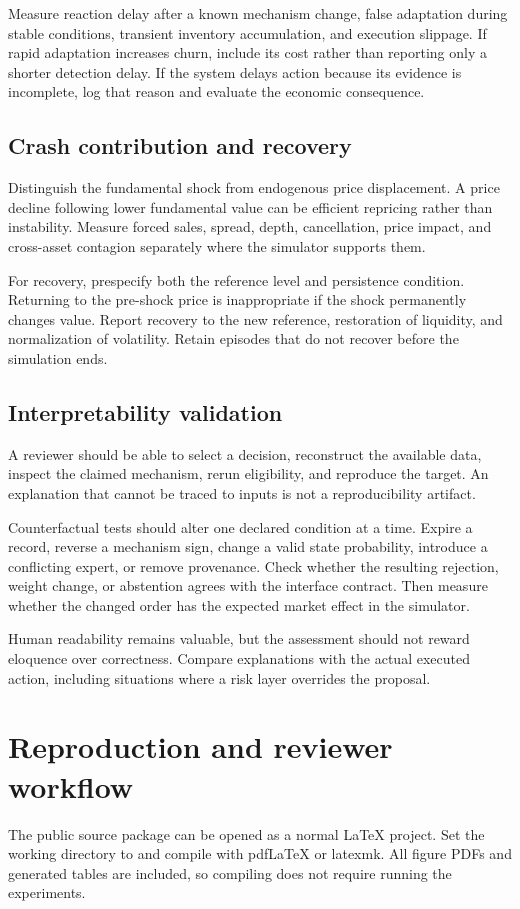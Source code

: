 Measure reaction delay after a known mechanism change, false adaptation during stable conditions, transient inventory accumulation, and execution slippage. If rapid adaptation increases churn, include its cost rather than reporting only a shorter detection delay. If the system delays action because its evidence is incomplete, log that reason and evaluate the economic consequence.

\subsection{Crash contribution and recovery}
Distinguish the fundamental shock from endogenous price displacement. A price decline following lower fundamental value can be efficient repricing rather than instability. Measure forced sales, spread, depth, cancellation, price impact, and cross-asset contagion separately where the simulator supports them.

For recovery, prespecify both the reference level and persistence condition. Returning to the pre-shock price is inappropriate if the shock permanently changes value. Report recovery to the new reference, restoration of liquidity, and normalization of volatility. Retain episodes that do not recover before the simulation ends.

\subsection{Interpretability validation}
A reviewer should be able to select a decision, reconstruct the available data, inspect the claimed mechanism, rerun eligibility, and reproduce the target. An explanation that cannot be traced to inputs is not a reproducibility artifact.

Counterfactual tests should alter one declared condition at a time. Expire a record, reverse a mechanism sign, change a valid state probability, introduce a conflicting expert, or remove provenance. Check whether the resulting rejection, weight change, or abstention agrees with the interface contract. Then measure whether the changed order has the expected market effect in the simulator.

Human readability remains valuable, but the assessment should not reward eloquence over correctness. Compare explanations with the actual executed action, including situations where a risk layer overrides the proposal.

\section{Reproduction and reviewer workflow}
The public source package can be opened as a normal LaTeX project. Set the working directory to  and compile  with pdfLaTeX or latexmk. All figure PDFs and generated tables are included, so compiling does not require running the experiments.

